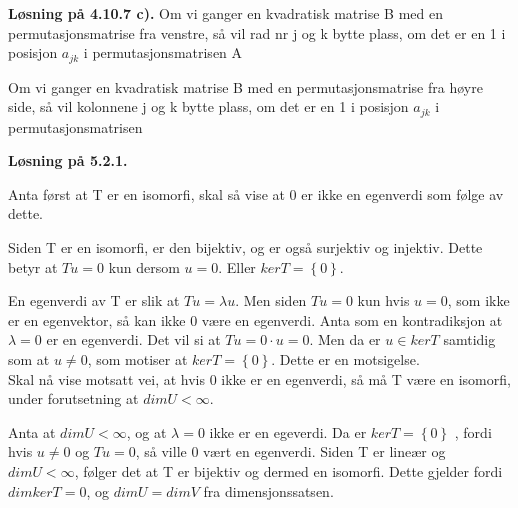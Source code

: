 \documentclass[a4paper,norsk]{article}
\newenvironment{oppgave}[1]%
	{\trivlist{}\item\relax\textbf{Løsning på #1.}\medspace}%
	{\endtrivlist}
\begin{document}
\begin{oppgave}{4.10.7 c)}
Om vi ganger en kvadratisk matrise B med en permutasjonsmatrise fra venstre, så vil rad nr j og k bytte plass, om det er en 1 i posisjon $ a_{jk} $  i permutasjonsmatrisen A

Om vi ganger en kvadratisk matrise B med en permutasjonsmatrise fra høyre side, så vil kolonnene j og k bytte plass, om det er en 1 i posisjon $ a_{jk} $ i permutasjonsmatrisen  
\end{oppgave}


\begin{oppgave}{5.2.1}

Anta først at T er en isomorfi, skal så vise at 0 er ikke en egenverdi som følge av dette.

Siden T er en isomorfi, er den bijektiv, og er også surjektiv og injektiv. Dette betyr at $ Tu = 0 $ kun dersom $ u=0$. Eller $ ker T = \left\{ 0 \right\}  $.

En egenverdi av T er slik at $ Tu = \lambda u $. Men siden $ Tu = 0 $ kun hvis $ u=0 $, som ikke er en egenvektor, så kan ikke 0 være en egenverdi. Anta som en kontradiksjon at $ \lambda = 0 $ er en egenverdi. Det vil si at $ Tu = 0  \cdot u=0$. Men da er $ u \in kerT $ samtidig som at $ u\neq 0 $, som motiser at $ kerT = \left\{ 0 \right\}  $. Dette er en motsigelse.\\




Skal nå vise motsatt vei, at hvis 0 ikke er en egenverdi, så må T være en isomorfi, under forutsetning at $ dimU < \infty $.

Anta at $ dimU < \infty $, og at $ \lambda = 0 $ ikke er en egeverdi. Da er $ kerT = \left\{ 0 \right\}  $ , fordi hvis $ u\neq 0 $ og $ Tu=0 $, så ville 0 vært en egenverdi. Siden T er lineær og $ dimU < \infty $, følger det at T er bijektiv og dermed en isomorfi. Dette gjelder fordi $ dim kerT = 0 $, og $ dimU = dimV $ fra dimensjonssatsen.   
\end{oppgave}
\end{document}
